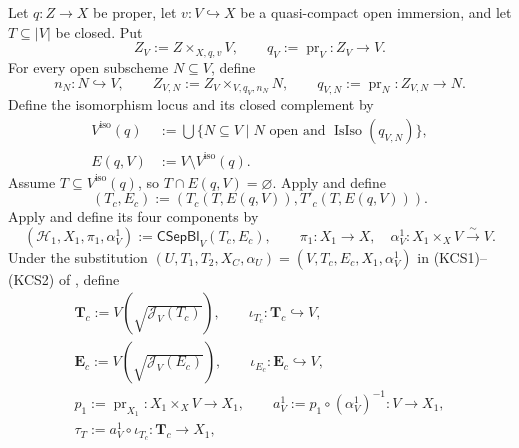 \begin{definition}
  \label{def:nagata-isomorphism-near-closure}

  Let $q\colon Z\to X$ be proper, let $v\colon V\hookrightarrow X$ be a
  quasi-compact open immersion, and let $T\subseteq|V|$ be closed.  Put
  \[
    Z_V:=Z\times_{X,q,v}V,
    \qquad
    q_V:=\operatorname{pr}_V\colon Z_V\longrightarrow V.           \tag{INC-1}
  \]
  For every open subscheme $N\subseteq V$, define
  \[
    n_N\colon N\hookrightarrow V,\qquad
    Z_{V,N}:=Z_V\times_{V,q_V,n_N}N,\qquad
    q_{V,N}:=\operatorname{pr}_N\colon Z_{V,N}\to N.               \tag{INC-0}
  \]
  Define the isomorphism locus and its closed complement by
  \[
  \begin{aligned}
    V^{\mathrm{iso}}(q)
      &:=\bigcup\{N\subseteq V\mid N\text{ open and }
         \operatorname{IsIso}(q_{V,N})\},\\
    E(q,V)&:=V\setminus V^{\mathrm{iso}}(q).
  \end{aligned}
  \]
  Assume $T\subseteq V^{\mathrm{iso}}(q)$, so
  $T\cap E(q,V)=\varnothing$.  Apply
   and define
  \[
    (T_c,E_c):=
      (T_c(T,E(q,V)),T'_c(T,E(q,V))).
  \]
  Apply  and define its four
  components by
  \[
    (\mathcal H_1,X_1,\pi_1,\alpha_V^1)
      :=\mathsf{CSepBl}_V(T_c,E_c),\qquad
    \pi_1\colon X_1\to X,\quad
    \alpha_V^1\colon X_1\times_XV\xrightarrow{\sim}V.              \tag{INC0a}
  \]
  Under the substitution
  $(U,T_1,T_2,X_C,\alpha_U)=(V,T_c,E_c,X_1,\alpha_V^1)$ in
  (KCS1)--(KCS2) of , define
  \[
  \begin{gathered}
    \mathbf T_c:=V(\sqrt{\mathcal J_V(T_c)}),\qquad
    \iota_{T_c}\colon\mathbf T_c\hookrightarrow V,\\
    \mathbf E_c:=V(\sqrt{\mathcal J_V(E_c)}),\qquad
    \iota_{E_c}\colon\mathbf E_c\hookrightarrow V,\\
    p_1:=\operatorname{pr}_{X_1}\colon X_1\times_XV\to X_1,
    \qquad
    a_V^1:=p_1\circ(\alpha_V^1)^{-1}\colon V\to X_1,\\
    \tau_T:=a_V^1\circ\iota_{T_c}\colon\mathbf T_c\to X_1,

\end{gathered}\]
\end{definition}
